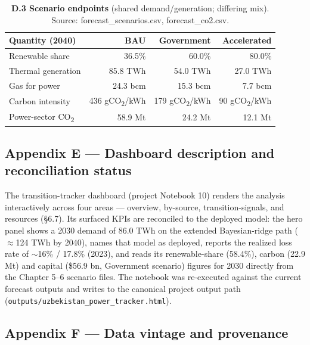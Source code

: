 \documentclass[10pt,twocolumn]{article}
\begin{document}
\begin{table}[tp]
\centering
\caption*{\textbf{D.3 Scenario endpoints} (shared demand/generation; differing mix). Source: forecast\_scenarios.csv, forecast\_co2.csv.}
\renewcommand{\arraystretch}{1.18}\small
\begin{tabularx}{\textwidth}{Lrrr}
\toprule
\textbf{Quantity (2040)} & \textbf{BAU} & \textbf{Government} & \textbf{Accelerated} \\
\midrule
Renewable share & 36.5\% & 60.0\% & 80.0\% \\
Thermal generation & 85.8 TWh & 54.0 TWh & 27.0 TWh \\
Gas for power & 24.3 bcm & 15.3 bcm & 7.7 bcm \\
Carbon intensity & 436 gCO\textsubscript{2}/kWh & 179 gCO\textsubscript{2}/kWh & 90 gCO\textsubscript{2}/kWh \\
Power-sector CO\textsubscript{2} & 58.9 Mt & 24.2 Mt & 12.1 Mt \\
\bottomrule
\end{tabularx}
\end{table}

\subsection*{Appendix E --- Dashboard description and reconciliation status}

The transition-tracker dashboard (project Notebook 10) renders the analysis interactively across four areas --- overview, by-source, transition-signals, and resources (\S{}6.7). Its surfaced KPIs are reconciled to the deployed model: the hero panel shows a 2030 demand of 86.0 TWh on the extended Bayesian-ridge path ($\approx$124 TWh by 2040), names that model as deployed, reports the realized loss rate of $\sim$16\% / 17.8\% (2023), and reads its renewable-share (58.4\%), carbon (22.9 Mt) and capital (\$56.9 bn, Government scenario) figures for 2030 directly from the Chapter 5--6 scenario files. The notebook was re-executed against the current forecast outputs and writes to the canonical project output path (\texttt{outputs/\allowbreak{}uzbekistan\_\allowbreak{}power\_\allowbreak{}tracker.html}).

\subsection*{Appendix F --- Data vintage and provenance}
\end{document}
